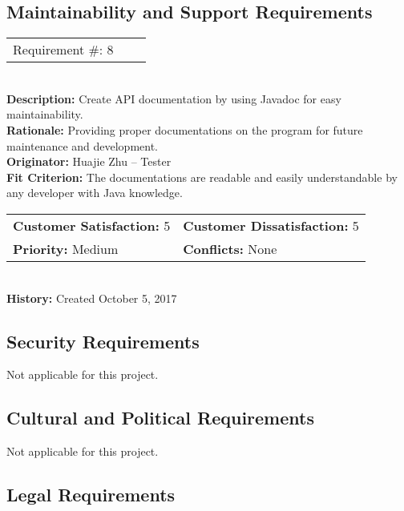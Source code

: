 \documentclass[12pt]{article}
\begin{document}
\newpage
\subsection{Maintainability and Support Requirements}

\begin{reqbox}
\begin{tabular}{ccc}Requirement \#: 8
\end{tabular} \\
\textbf{Description:} Create API documentation by using Javadoc for easy maintainability.\\
\textbf{Rationale:} Providing proper documentations on the program for future maintenance and development.\\
\textbf{Originator:} Huajie Zhu -- Tester \\
\textbf{Fit Criterion:} The documentations are readable and easily understandable by any developer with Java knowledge.\\
\begin{tabular}{ll}
\textbf{Customer Satisfaction:} 5 & \textbf{Customer Dissatisfaction:} 5 \\
\textbf{Priority:} Medium & \textbf{Conflicts:} None\\
\end{tabular} \\
\textbf{History:} Created October 5, 2017
\end{reqbox}


\subsection{Security Requirements}
Not applicable for this project.


\subsection{Cultural and Political Requirements}
Not applicable for this project.



\subsection{Legal Requirements}
\end{document}
